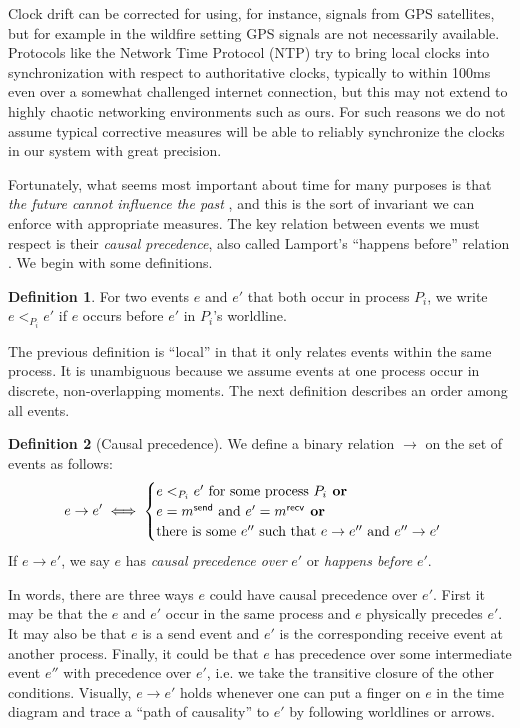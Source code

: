 \documentclass[]             %
{NASA}                       %
\theoremstyle{definition}
\newtheorem{definition}{Definition}[section]
\begin{document}
Clock drift can be corrected for using, for instance, signals from GPS
satellites, but for example in the wildfire setting GPS signals are
not necessarily available. Protocols like the Network Time Protocol
(NTP) \cite{rfc1119} try to bring local clocks into synchronization
with respect to authoritative clocks, typically to within 100ms even
over a somewhat challenged internet connection, but this may not
extend to highly chaotic networking environments such as ours. For
such reasons we do not assume typical corrective measures will be able
to reliably synchronize the clocks in our system with great precision.

Fortunately, what seems most important about time for many purposes is
that \emph{the future cannot influence the past} \cite{1989mattern}, and
this is the sort of invariant we can enforce with appropriate
measures. The key relation between events we must respect is their
\emph{causal precedence}, also called Lamport's ``happens before''
relation \cite{1978:lamportclocks}. We begin with some definitions.

\begin{definition}
  For two events $e$ and $e'$ that both occur in process $P_i$, we
  write $e <_{P_i} e'$ if $e$ occurs before $e'$ in $P_i$'s
  worldline.
\end{definition}
The previous definition is ``local'' in that it only relates events
within the same process. It is unambiguous because we assume events at
one process occur in discrete, non-overlapping moments. The next
definition describes an order among all events.

\begin{definition}[Causal precedence]
  \label{def:causalprecedence}
  We define a binary relation $\to$ on the set of events as follows:
  \[e \to e' \iff
  \begin{cases}
    e <_{P_i} e' \textrm{ for some process $P_i$}
    \textbf{ or} \\
    e = m_{}^{\mathsf{send}} \textrm{ and } e' =m_{}^{\mathsf{recv}}
    \textbf{ or} \\
    \textrm{there is some } e'' \textrm{ such that } e \to e'' \textrm{ and } e'' \to e'
  \end{cases}
  \]
  If $e \to e'$, we say $e$ has \emph{causal precedence over} $e'$ or
  \emph{happens before} $e'$.
\end{definition}

In words, there are three ways $e$ could have causal precedence over
$e'$.  First it may be that the $e$ and $e'$ occur in the same process
and $e$ physically precedes $e'$. It may also be that $e$ is a
send event and $e'$ is the corresponding receive event at another
process. Finally, it could be that $e$ has precedence over some
intermediate event $e''$ with precedence over $e'$, i.e. we take
the transitive closure of the other conditions. Visually, $e \to e'$
holds whenever one can put a finger on $e$ in the time diagram and
trace a ``path of causality'' to $e'$ by following worldlines or
arrows.
\end{document}
